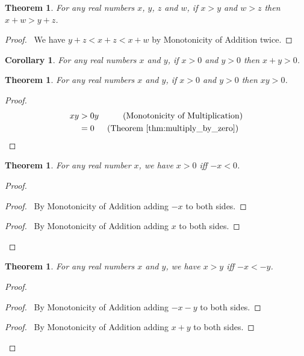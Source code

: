 \documentclass{report}
\let\qed\relax
\newtheorem{cor}{Corollary}[ax]
\newtheorem{thm}[ax]{Theorem}
\theoremstyle{definition}
\begin{document}
\begin{thm}
For any real numbers $x$, $y$, $z$ and $w$, if $x > y$ and $w > z$ then $x + w > y + z$.
\end{thm}

\begin{proof}
\pf\ We have $y + z < x + z < x + w$ by Monotonicity of Addition twice. \qed
\end{proof}

\begin{cor}
For any real numbers $x$ and $y$, if $x > 0$ and $y > 0$ then $x + y > 0$.
\end{cor}

\begin{thm}
For any real numbers $x$ and $y$, if $x > 0$ and $y > 0$ then $xy > 0$.
\end{thm}

\begin{proof}
\pf
\begin{align*}
	xy & > 0y & (\text{Monotonicity of Multiplication}) \\
	& = 0 & (\text{Theorem \ref{thm:multiply_by_zero}}) \enspace \qed
\end{align*}
\end{proof}

\begin{thm}
\label{thm:negation_positive}
For any real number $x$, we have $x > 0$ iff $-x < 0$.
\end{thm}

\begin{proof}
\pf
{}
\begin{proof}
	\pf\ By Monotonicity of Addition adding $-x$ to both sides.
\end{proof}
\begin{proof}
	\pf\ By Monotonicity of Addition adding $x$ to both sides.
\end{proof}
\qed
\end{proof}

\begin{thm}
For any real numbers $x$ and $y$, we have $x > y$ iff $-x < -y$.
\end{thm}

\begin{proof}
\pf
{}
\begin{proof}
	\pf\ By Monotonicity of Addition adding $-x-y$ to both sides.
\end{proof}
\begin{proof}
	\pf\ By Monotonicity of Addition adding $x + y$ to both sides.
\end{proof}
\qed
\end{proof}
\end{document}
